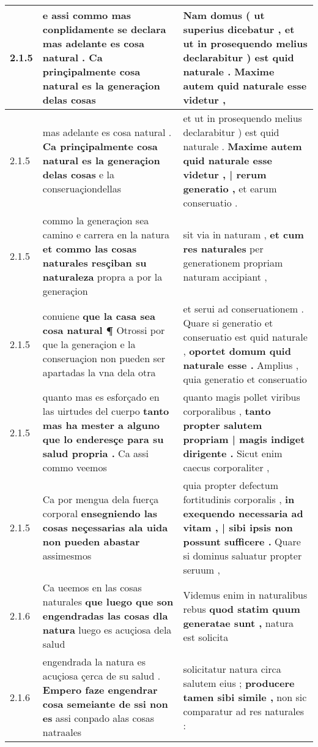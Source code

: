 \begin{tabular}{|p{1cm}|p{6.5cm}|p{6.5cm}|}
2.1.5 & e assi commo mas conplidamente se declara \textbf{ mas adelante es cosa natural . } Ca prinçipalmente cosa natural es la generaçion delas cosas & Nam domus ( ut superius dicebatur , \textbf{ et ut in prosequendo melius declarabitur ) est quid naturale . } Maxime autem quid naturale esse videtur , \\\hline
2.1.5 & mas adelante es cosa natural . \textbf{ Ca prinçipalmente cosa natural es la generaçion delas cosas } e la conseruaçiondellas & et ut in prosequendo melius declarabitur ) est quid naturale . \textbf{ Maxime autem quid naturale esse videtur , | rerum generatio , } et earum conseruatio . \\\hline
2.1.5 & commo la generaçion sea camino e carrera en la natura \textbf{ et commo las cosas naturales resçiban su naturaleza } propra a por la generaçion & sit via in naturam , \textbf{ et cum res naturales } per generationem propriam naturam accipiant , \\\hline
2.1.5 & conuiene \textbf{ que la casa sea cosa natural ¶ } Otrossi por que la generaçion e la conseruaçion non pueden ser apartadas la vna dela otra & et serui ad conseruationem . Quare si generatio et conseruatio est quid naturale , \textbf{ oportet domum quid naturale esse . } Amplius , quia generatio et conseruatio \\\hline
2.1.5 & quanto mas es esforçado en las uirtudes del cuerpo \textbf{ tanto mas ha mester a alguno que lo enderesçe para su salud propria . } Ca assi commo veemos & quanto magis pollet viribus corporalibus , \textbf{ tanto propter salutem propriam | magis indiget dirigente . } Sicut enim caecus corporaliter , \\\hline
2.1.5 & Ca por mengua dela fuerça corporal \textbf{ ensegniendo las cosas neçessarias ala uida non pueden abastar } assimesmos & quia propter defectum fortitudinis corporalis , \textbf{ in exequendo necessaria ad vitam , | sibi ipsis non possunt sufficere . } Quare si dominus saluatur propter seruum , \\\hline
2.1.6 & Ca ueemos en las cosas naturales \textbf{ que luego que son engendradas las cosas dla natura } luego es acuçiosa dela salud & Videmus enim in naturalibus rebus \textbf{ quod statim quum generatae sunt , } natura est solicita \\\hline
2.1.6 & engendrada la natura es acuçiosa çerca de su salud . \textbf{ Empero faze engendrar cosa semeiante de ssi non es } assi conpado alas cosas natraales & solicitatur natura circa salutem eius ; \textbf{ producere tamen sibi simile , } non sic comparatur ad res naturales : \\\hline

\end{tabular}
